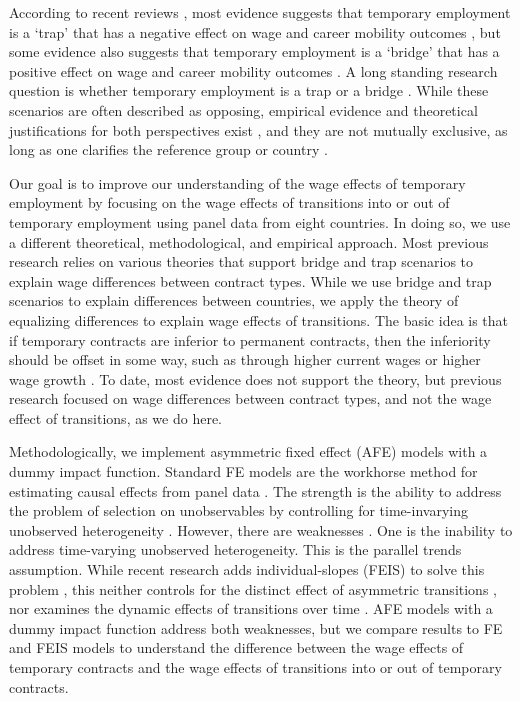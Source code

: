 \documentclass[12pt]{article}
\begin{document}
According to recent reviews \citep{latner_wage_2022,filomena_picchio_2022}, most evidence suggests that temporary employment is a `trap' that has a negative effect on wage and career mobility outcomes \citep{giesecke_external_2004,gebel_early_2010,pavlopoulos_starting_2013,barbieri_dual_2018}, but some evidence also suggests that temporary employment is a `bridge' that has a positive effect on wage and career mobility outcomes \citep{remery_labour_2002, gash_fixed-term_2007,de_lange_consequences_2014,gebel_is_2013}.  A long standing research question is whether temporary employment is a trap or a bridge \citep{booth_temporary_2002,scherer_stepping-stones_2004,gash_bridge_2008,babos_step_2014,mcvicar_contingent_2019,mattijssen_multichannel_2019}.  While these scenarios are often described as opposing, empirical evidence and theoretical justifications for both perspectives exist \citep{mattijssen_occupations_2020}, and they are not mutually exclusive, as long as one clarifies the reference group or country \citep{latner_wage_2022}.  

Our goal is to improve our understanding of the wage effects of temporary employment by focusing on the wage effects of transitions into or out of temporary employment using panel data from eight countries.  In doing so, we use a different theoretical, methodological, and empirical approach.  Most previous research relies on various theories that support bridge and trap scenarios to explain wage differences between contract types.  While we use bridge and trap scenarios to explain differences between countries, we apply the theory of equalizing differences to explain wage effects of transitions.  The basic idea is that if temporary contracts are inferior to permanent contracts, then the inferiority should be offset in some way, such as through higher current wages or higher wage growth \citep{rosen_theory_1986}.  To date, most evidence does not support the theory, but previous research focused on wage differences between contract types, and not the wage effect of transitions, as we do here.  

Methodologically, we implement asymmetric fixed effect (AFE) models with a dummy impact function.  Standard FE models are the workhorse method for estimating causal effects from panel data \citep{wooldridge2005fixed,imai2021use}.  The strength is the ability to address the problem of selection on unobservables by controlling for time-invarying unobserved heterogeneity \citep{halaby_panel_2004,gangl_causal_2010}.  However, there are weaknesses \citep{collischon2020let}.  One is the inability to address time-varying unobserved heterogeneity.  This is the parallel trends assumption.  While recent research adds individual-slopes (FEIS) to solve this problem \citep{ludwig_is_2018}, this neither controls for the distinct effect of asymmetric transitions \citep{allison_asymmetric_2019}, nor examines the dynamic effects of transitions over time \citep{andres_applied_2013,ludwig_what_2021}.  AFE models with a dummy impact function address both weaknesses, but we compare results to FE and FEIS models to understand the difference between the wage effects of temporary contracts and the wage effects of transitions into or out of temporary contracts.  
\end{document}
